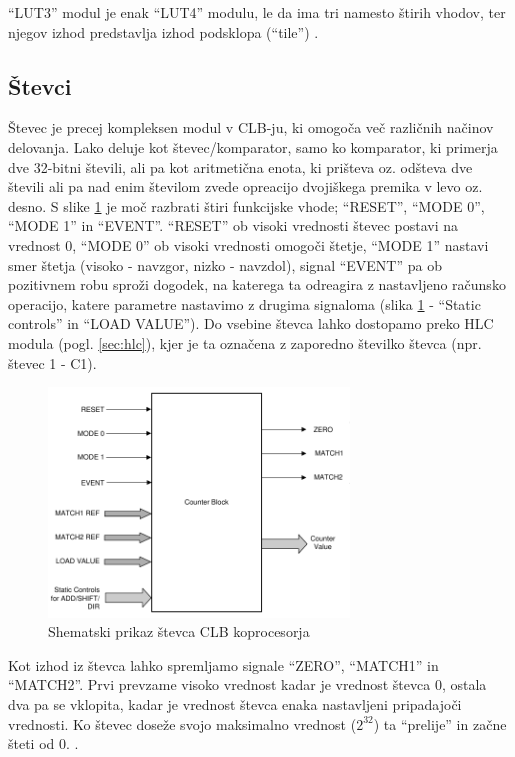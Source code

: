 \documentclass[a4paper]{article}
\begin{document}
\begin{sloppypar}
``LUT3'' modul je enak ``LUT4'' modulu, le da ima tri namesto štirih vhodov,
ter njegov izhod predstavlja izhod podsklopa (``tile'')
\cite[Pogl.~26.4.4-26.4.5]{mcu-ref-manual}.

\subsection{Števci}
Števec je precej kompleksen modul v CLB-ju, ki omogoča več različnih načinov
delovanja.  Lako deluje kot števec/komparator, samo ko komparator, ki primerja
dve 32-bitni števili, ali pa kot aritmetična enota, ki prišteva oz. odšteva dve
števili ali pa nad enim številom zvede opreacijo dvojiškega premika v levo oz.
desno. S slike \ref{fig:stevec} je moč razbrati štiri funkcijske vhode;
``RESET'', ``MODE 0'', ``MODE 1'' in ``EVENT''. ``RESET'' ob visoki vrednosti
števec postavi na vrednost 0, ``MODE 0'' ob visoki vrednosti omogoči štetje,
``MODE 1'' nastavi smer štetja (visoko - navzgor, nizko - navzdol), signal
``EVENT'' pa ob pozitivnem robu sproži dogodek, na katerega ta odreagira z
nastavljeno računsko operacijo, katere parametre nastavimo z drugima signaloma
(slika \ref{fig:stevec} - ``Static controls'' in ``LOAD VALUE''). Do vsebine
števca lahko dostopamo preko HLC modula (pogl. \ref{sec:hlc}), kjer je ta
označena z zaporedno številko števca (npr. števec 1 - C1).

\begin{figure}[htb]
    \centerline{\includegraphics[width=8cm]{shema_stevec}}
    \caption{Shematski prikaz števca CLB koprocesorja
             \cite[Pogl.~26.4.2.1]{mcu-ref-manual}}
    \label{fig:stevec} 
\end{figure} 

Kot izhod iz števca lahko spremljamo signale ``ZERO'', ``MATCH1'' in
``MATCH2''. Prvi prevzame visoko vrednost kadar je vrednost števca 0, ostala
dva pa se vklopita, kadar je vrednost števca enaka nastavljeni pripadajoči
vrednosti. Ko števec doseže svojo maksimalno vrednost ($2^{32}$) ta ``prelije''
in začne šteti od 0.
\cite[Pogl.~26.4.2]{mcu-ref-manual}.


\end{sloppypar}
\end{document}
